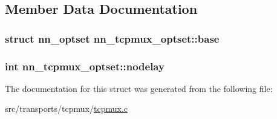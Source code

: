 \subsection{Member Data Documentation}
\subsubsection[{base}]{\setlength{\rightskip}{0pt plus 5cm}struct {\bf nn\+\_\+optset} nn\+\_\+tcpmux\+\_\+optset\+::base}\hypertarget{structnn__tcpmux__optset_a8c56761edc7976991ad1bb4ae6c44602}{}\label{structnn__tcpmux__optset_a8c56761edc7976991ad1bb4ae6c44602}
\subsubsection[{nodelay}]{\setlength{\rightskip}{0pt plus 5cm}int nn\+\_\+tcpmux\+\_\+optset\+::nodelay}\hypertarget{structnn__tcpmux__optset_a0c2c92a026e80f5c250aff379000fe12}{}\label{structnn__tcpmux__optset_a0c2c92a026e80f5c250aff379000fe12}


The documentation for this struct was generated from the following file\+:\begin{DoxyCompactItemize}
\item 
src/transports/tcpmux/\hyperlink{src_2transports_2tcpmux_2tcpmux_8c}{tcpmux.\+c}\end{DoxyCompactItemize}

